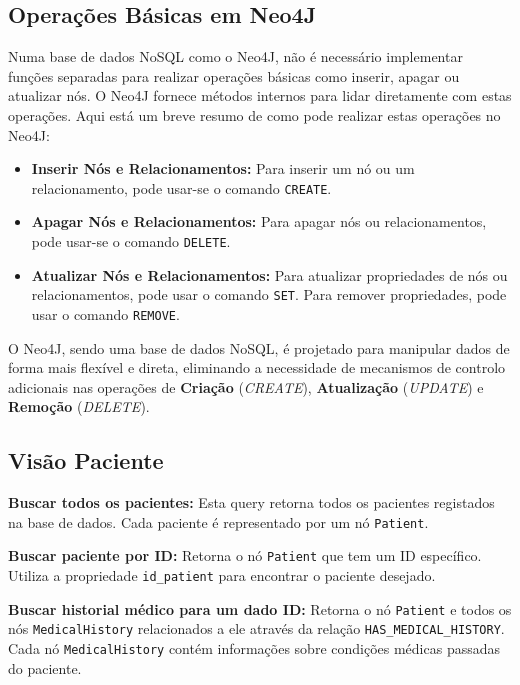 \subsection{Operações Básicas em Neo4J}

Numa base de dados NoSQL como o Neo4J, não é necessário implementar funções separadas para realizar operações básicas como inserir, apagar ou atualizar nós. O Neo4J fornece métodos internos para lidar diretamente com estas operações. Aqui está um breve resumo de como pode realizar estas operações no Neo4J:

\begin{itemize}
    \item \textbf{Inserir Nós e Relacionamentos:} Para inserir um nó ou um relacionamento, pode usar-se o comando \texttt{CREATE}.
    \item \textbf{Apagar Nós e Relacionamentos:} Para apagar nós ou relacionamentos, pode usar-se o comando \texttt{DELETE}.
    \item \textbf{Atualizar Nós e Relacionamentos:} Para atualizar propriedades de nós ou relacionamentos, pode usar o comando \texttt{SET}. Para remover propriedades, pode usar o comando \texttt{REMOVE}.
\end{itemize}

O Neo4J, sendo uma base de dados NoSQL, é projetado para manipular dados de forma mais flexível e direta, eliminando a necessidade de mecanismos de controlo adicionais nas operações de \textbf{Criação} (\textit{CREATE}), \textbf{Atualização} (\textit{UPDATE}) e \textbf{Remoção} (\textit{DELETE}). 

\subsection{Visão Paciente}

\vspace{0.15cm} 
\textbf{Buscar todos os pacientes:} Esta query retorna todos os pacientes registados na base de dados. Cada paciente é representado por um nó \texttt{Patient}.

\vspace{0.15cm} 
\textbf{Buscar paciente por ID:} Retorna o nó \texttt{Patient} que tem um ID específico. Utiliza a propriedade \texttt{id\_patient} para encontrar o paciente desejado.

\vspace{0.15cm} 
\textbf{Buscar historial médico para um dado ID:} Retorna o nó \texttt{Patient} e todos os nós \texttt{MedicalHistory} relacionados a ele através da relação \texttt{HAS\_MEDICAL\_HISTORY}. Cada nó \texttt{MedicalHistory} contém informações sobre condições médicas passadas do paciente.

